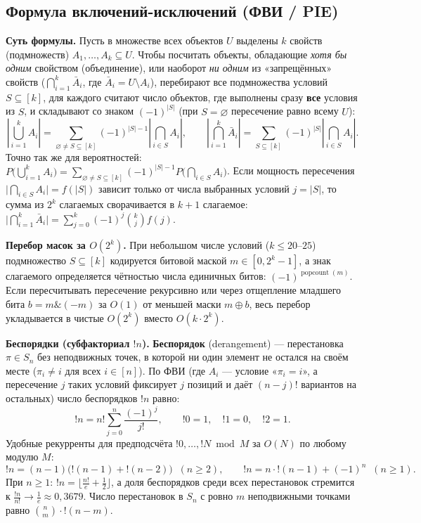\documentclass[10pt,a4paper]{article}
\renewcommand{\le}{\leqslant}
\renewcommand{\ge}{\geqslant}
\renewcommand{\emptyset}{\varnothing}
\DeclareMathOperator{\popcnt}{popcount}
\begin{document}
\subsection{Формула включений-исключений (ФВИ / PIE)}

\textbf{Суть формулы.} Пусть в множестве всех объектов $U$ выделены $k$ свойств (подмножеств) $A_1, \dots, A_k \subseteq U$. Чтобы посчитать объекты, обладающие \emph{хотя бы одним} свойством (объединение), или наоборот \emph{ни одним} из «запрещённых» свойств ($\bigcap_{i=1}^k \bar{A}_i$, где $\bar{A}_i = U \setminus A_i$), перебирают все подмножества условий $S \subseteq [k]$, для каждого считают число объектов, где выполнены сразу \textbf{все} условия из $S$, и складывают со знаком $(-1)^{|S|}$ (при $S = \emptyset$ пересечение равно всему $U$):
\[
  \left|\bigcup_{i=1}^{k} A_i\right| = \sum_{\emptyset \ne S \subseteq [k]} (-1)^{|S| - 1} \left|\bigcap_{i \in S} A_i\right|, \qquad
  \left|\bigcap_{i=1}^{k} \bar{A}_i\right| = \sum_{S \subseteq [k]} (-1)^{|S|} \left|\bigcap_{i \in S} A_i\right|.
\]
Точно так же для вероятностей: $P\bigl(\bigcup_{i=1}^k A_i\bigr) = \sum_{\emptyset \ne S \subseteq [k]} (-1)^{|S|-1} P\bigl(\bigcap_{i \in S} A_i\bigr)$. Если мощность пересечения $\bigl|\bigcap_{i \in S} A_i\bigr| = f(|S|)$ зависит только от числа выбранных условий $j = |S|$, то сумма из $2^k$ слагаемых сворачивается в $k + 1$ слагаемое: $\bigl|\bigcap_{i=1}^k \bar{A}_i\bigr| = \sum_{j=0}^k (-1)^j \binom{k}{j} f(j)$.

\textbf{Перебор масок за $O(2^k)$.} При небольшом числе условий ($k \le 20\text{--}25$) подмножество $S \subseteq [k]$ кодируется битовой маской $m \in [0, 2^k - 1]$, а знак слагаемого определяется чётностью числа единичных битов: $(-1)^{\popcnt(m)}$. Если пересчитывать пересечение рекурсивно или через отщепление младшего бита $b = m \mathbin{\&} (-m)$ за $O(1)$ от меньшей маски $m \oplus b$, весь перебор укладывается в чистые $O(2^k)$ вместо $O(k \cdot 2^k)$.

\textbf{Беспорядки (субфакториал $!n$).} \textbf{Беспорядок} (derangement) — перестановка $\pi \in S_n$ без неподвижных точек, в которой ни один элемент не остался на своём месте ($\pi_i \ne i$ для всех $i \in [n]$). По ФВИ (где $A_i$ — условие «$\pi_i = i$», а пересечение $j$ таких условий фиксирует $j$ позиций и даёт $(n - j)!$ вариантов на остальных) число беспорядков $!n$ равно:
\[
  !n = n! \sum_{j=0}^{n} \frac{(-1)^j}{j!}, \qquad !0 = 1, \quad !1 = 0, \quad !2 = 1.
\]
Удобные рекурренты для предподсчёта $!0, \dots, !N \bmod M$ за $O(N)$ по любому модулю $M$:
\[
  !n = (n - 1)\bigl(!(n - 1) + !(n - 2)\bigr) \;\; (n \ge 2), \qquad
  !n = n \cdot !(n - 1) + (-1)^n \;\; (n \ge 1).
\]
При $n \ge 1$: $!n = \bigl\lfloor \frac{n!}{e} + \frac{1}{2} \bigr\rfloor$, а доля беспорядков среди всех перестановок стремится к $\frac{!n}{n!} \to \frac{1}{e} \approx 0{,}3679$. Число перестановок в $S_n$ с ровно $m$ неподвижными точками равно $\binom{n}{m} \cdot !(n - m)$.
\end{document}
